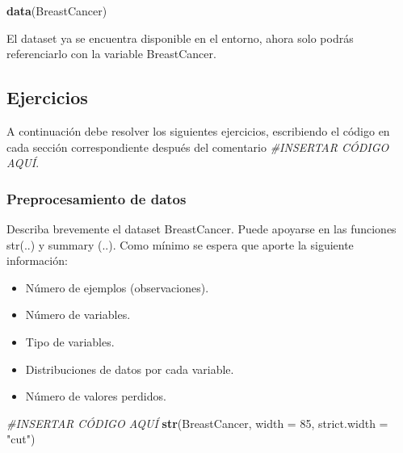 \documentclass[
]{article}
\newenvironment{Shaded}{\begin{snugshade}}{\end{snugshade}}
\newcommand{\CommentTok}[1]{\textcolor[rgb]{0.56,0.35,0.01}{\textit{#1}}}
\newcommand{\DataTypeTok}[1]{\textcolor[rgb]{0.13,0.29,0.53}{#1}}
\newcommand{\DecValTok}[1]{\textcolor[rgb]{0.00,0.00,0.81}{#1}}
\newcommand{\KeywordTok}[1]{\textcolor[rgb]{0.13,0.29,0.53}{\textbf{#1}}}
\newcommand{\NormalTok}[1]{#1}
\newcommand{\StringTok}[1]{\textcolor[rgb]{0.31,0.60,0.02}{#1}}
\providecommand{\tightlist}{%
  \setlength{\itemsep}{0pt}\setlength{\parskip}{0pt}}
\begin{document}
\begin{Shaded}
\begin{Highlighting}[]
\KeywordTok{data}\NormalTok{(BreastCancer)}
\end{Highlighting}
\end{Shaded}

El dataset ya se encuentra disponible en el entorno, ahora solo podrás
referenciarlo con la variable BreastCancer.

\hypertarget{ejercicios}{%
\subsection{Ejercicios}\label{ejercicios}}

A continuación debe resolver los siguientes ejercicios, escribiendo el
código en cada sección correspondiente después del comentario
\emph{\#INSERTAR CÓDIGO AQUÍ}.

\hypertarget{preprocesamiento-de-datos}{%
\subsubsection{Preprocesamiento de
datos}\label{preprocesamiento-de-datos}}

Describa brevemente el dataset BreastCancer. Puede apoyarse en las
funciones str(..) y summary (..). Como mínimo se espera que aporte la
siguiente información:

\begin{itemize}
\tightlist
\item
  Número de ejemplos (observaciones).
\item
  Número de variables.
\item
  Tipo de variables.
\item
  Distribuciones de datos por cada variable.
\item
  Número de valores perdidos.
\end{itemize}

\begin{Shaded}
\begin{Highlighting}[]
\CommentTok{#INSERTAR CÓDIGO AQUÍ}
\KeywordTok{str}\NormalTok{(BreastCancer, }\DataTypeTok{width =} \DecValTok{85}\NormalTok{, }\DataTypeTok{strict.width =} \StringTok{"cut"}\NormalTok{)}
\end{Highlighting}
\end{Shaded}
\end{document}
